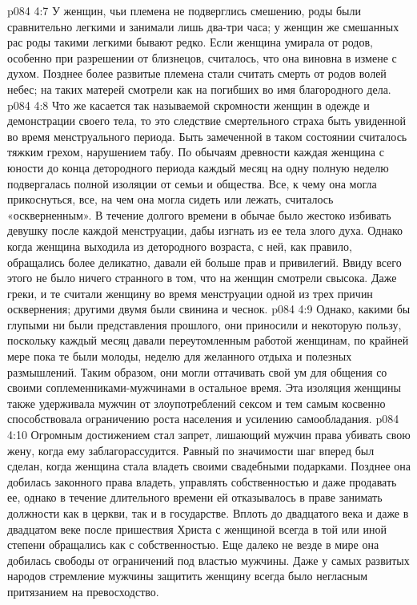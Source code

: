 \vs p084 4:7 У женщин, чьи племена не подверглись смешению, роды были сравнительно легкими и занимали лишь два\hyp{}три часа; у женщин же смешанных рас роды такими легкими бывают редко. Если женщина умирала от родов, особенно при разрешении от близнецов, считалось, что она виновна в измене с духом. Позднее более развитые племена стали считать смерть от родов волей небес; на таких матерей смотрели как на погибших во имя благородного дела.
\vs p084 4:8 Что же касается так называемой скромности женщин в одежде и демонстрации своего тела, то это следствие смертельного страха быть увиденной во время менструального периода. Быть замеченной в таком состоянии считалось тяжким грехом, нарушением табу. По обычаям древности каждая женщина с юности до конца детородного периода каждый месяц на одну полную неделю подвергалась полной изоляции от семьи и общества. Все, к чему она могла прикоснуться, все, на чем она могла сидеть или лежать, считалось «оскверненным». В течение долгого времени в обычае было жестоко избивать девушку после каждой менструации, дабы изгнать из ее тела злого духа. Однако когда женщина выходила из детородного возраста, с ней, как правило, обращались более деликатно, давали ей больше прав и привилегий. Ввиду всего этого не было ничего странного в том, что на женщин смотрели свысока. Даже греки, и те считали женщину во время менструации одной из трех причин осквернения; другими двумя были свинина и чеснок.
\vs p084 4:9 Однако, какими бы глупыми ни были представления прошлого, они приносили и некоторую пользу, поскольку каждый месяц давали переутомленным работой женщинам, по крайней мере пока те были молоды, неделю для желанного отдыха и полезных размышлений. Таким образом, они могли оттачивать свой ум для общения со своими соплеменниками\hyp{}мужчинами в остальное время. Эта изоляция женщины также удерживала мужчин от злоупотреблений сексом и тем самым косвенно способствовала ограничению роста населения и усилению самообладания.
\vs p084 4:10 \pc Огромным достижением стал запрет, лишающий мужчин права убивать свою жену, когда ему заблагорассудится. Равный по значимости шаг вперед был сделан, когда женщина стала владеть своими свадебными подарками. Позднее она добилась законного права владеть, управлять собственностью и даже продавать ее, однако в течение длительного времени ей отказывалось в праве занимать должности как в церкви, так и в государстве. Вплоть до двадцатого века и даже в двадцатом веке после пришествия Христа с женщиной всегда в той или иной степени обращались как с собственностью. Еще далеко не везде в мире она добилась свободы от ограничений под властью мужчины. Даже у самых развитых народов стремление мужчины защитить женщину всегда было негласным притязанием на превосходство.
